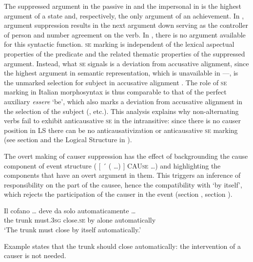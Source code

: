 \documentclass[output=paper,colorlinks,citecolor=brown
]{langscibook}
\begin{document}
The suppressed argument in the passive in  and the impersonal in  is the highest argument of a state and, respectively, the only argument of an achievement. In , argument suppression results in the next argument down serving as the controller of person and number agreement on the verb. In , there is no argument available for this syntactic function. \textsc{se} marking is independent of the lexical aspectual properties of the predicate and the related thematic properties of the suppressed argument. Instead, what \textsc{se} signals is a deviation from accusative alignment, since the highest argument in semantic representation, which is unavailable in —, is the unmarked selection for subject in accusative alignment \citep[175]{vanvalin1997syntax}. The role of \textsc{se} marking in Italian morphosyntax is thus comparable to that of the perfect auxiliary \textit{essere} ‘be’, which also marks a deviation from accusative alignment in the selection of the subject (\cite{lafauci1988oggetti,bentley2006split,ledgeway2012latin,loporcaro2016auxiliary}, etc.). This analysis explains why non-alternating verbs fail to exhibit anticausative \textsc{se} in the intransitive: since there is no causer position in LS there can be no anticausativization or anticausative \textsc{se} marking (see section  and the Logical Structure in ).

The overt making of causer suppression has the effect of backgrounding the cause component of event structure ( $\lbrack$ ´ ( \ldots ) $\rbrack$ CAU\textsc{se} \ldots ) and highlighting the components that have an overt argument in them. This triggers an inference of responsibility on the part of the causee, hence the compatibility with ‘by itself’, which rejects the participation of the causer in the event (section , section ). 

\ea \label{bentley_example_53}
\gll Il		cofano  {\ldots} 		deve					 da		solo		automaticamente {\ldots } \\
	the	trunk	{}						must.3\textsc{sg}		close.\textsc{se}			by	alone	automatically \\
\glt ‘The trunk must close by itself automatically.’
\z

Example  states that the trunk should close automatically: the intervention of a causer is not needed. 
\end{document}
